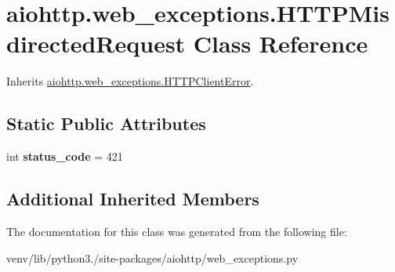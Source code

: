 \hypertarget{classaiohttp_1_1web__exceptions_1_1_h_t_t_p_misdirected_request}{}\section{aiohttp.\+web\+\_\+exceptions.\+H\+T\+T\+P\+Misdirected\+Request Class Reference}
\label{classaiohttp_1_1web__exceptions_1_1_h_t_t_p_misdirected_request}


Inherits \hyperlink{classaiohttp_1_1web__exceptions_1_1_h_t_t_p_client_error}{aiohttp.\+web\+\_\+exceptions.\+H\+T\+T\+P\+Client\+Error}.

\subsection*{Static Public Attributes}
\begin{DoxyCompactItemize}
\item 
\mbox{\label{classaiohttp_1_1web__exceptions_1_1_h_t_t_p_misdirected_request_a1029e63388bd55fdb9ab7437e53579c3}} 
int {\bfseries status\+\_\+code} = 421
\end{DoxyCompactItemize}
\subsection*{Additional Inherited Members}


The documentation for this class was generated from the following file\+:\begin{DoxyCompactItemize}
\item 
venv/lib/python3./site-\/packages/aiohttp/web\+\_\+exceptions.\+py\end{DoxyCompactItemize}
